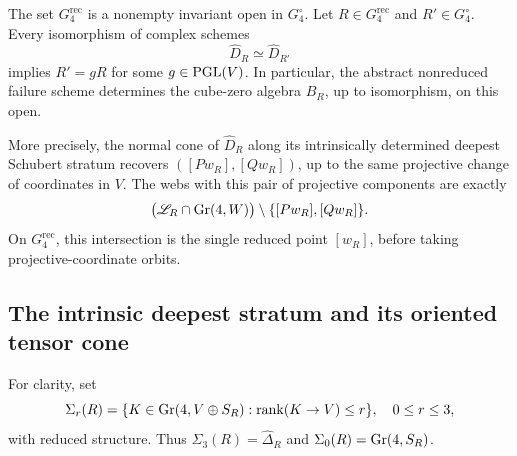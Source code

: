 \begin{theorem}
\label{thm:generic-intrinsic-web}
The set \(G_4^{\mathrm{rec}}\) is a nonempty invariant open in
\(G_4^\circ\).  Let \(R\in G_4^{\mathrm{rec}}\) and
\(R'\in G_4^\circ\).  Every isomorphism of complex schemes
\[
 \widehat D_R\simeq\widehat D_{R'}
\]
implies \(R'=gR\) for some \(g\in\operatorname{PGL}(V)\).  In particular,
the abstract nonreduced failure scheme determines the cube-zero
algebra \(B_R\), up to isomorphism, on this open.

More precisely, the normal cone of \(\widehat D_R\) along its
intrinsically determined deepest Schubert stratum recovers
\(([Pw_R],[Qw_R])\), up to the same projective change of coordinates
in \(V\).  The webs with this pair of projective components are
exactly
\begin{equation}\label{eq:exact-plucker-pencil}
 \bigl(\mathscr L_R\cap\operatorname{Gr}(4,W)\bigr)
 \setminus\{[Pw_R],[Qw_R]\}.
\end{equation}
On \(G_4^{\mathrm{rec}}\), this intersection is the single
reduced point \([w_R]\), before taking projective-coordinate
orbits.
\end{theorem}

\subsection{The intrinsic deepest stratum and its oriented tensor cone}

For clarity, set
\[
 \Sigma_r(R)=\{K\in\operatorname{Gr}(4,V\oplus S_R):
                    \operatorname{rank}(K\to V)\le r\},\quad 0\le r\le3,
\]
with reduced structure.  Thus \(\Sigma_3(R)=\widehat\Delta_R\)
and \(\Sigma_0(R)=\operatorname{Gr}(4,S_R)\).

